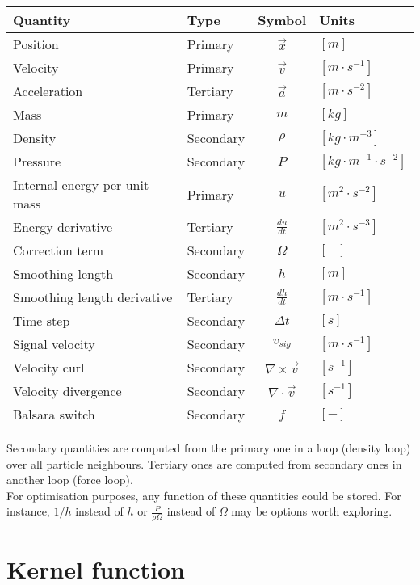 \documentclass[a4paper,10pt]{report}
\begin{document}
\begin{table}[h]
\centering
\begin{tabular}{|l|l|c|l|}
 \hline
 \textbf{Quantity} & \textbf{Type} & \textbf{Symbol} & \textbf{Units} \\
 \hline \hline
 Position & Primary & $\vec{x}$ & $[m]$ \\
 Velocity & Primary &$\vec{v}$ & $[m\cdot s^{-1}]$ \\
 Acceleration & Tertiary &$\vec{a}$ & $[m\cdot s^{-2}]$ \\
 Mass & Primary &$m$ & $[kg]$ \\
 Density & Secondary & $\rho$ & $[kg\cdot m^{-3}]$ \\
 Pressure & Secondary & $P$ & $[kg \cdot m^{-1}\cdot s^{-2}]$ \\
 Internal energy per unit mass & Primary & $u$ & $[m^2 \cdot s^{-2}]$ \\ 
 Energy derivative & Tertiary & $\frac{du}{dt}$ & $[ m^2 \cdot s^{-3}]$ \\
 Correction term & Secondary & $\Omega$ & $[-]$ \\
 Smoothing length & Secondary &$h$ & $[m]$ \\
 Smoothing length derivative & Tertiary &$\frac{dh}{dt}$ & $[m\cdot s^{-1}]$ \\
 Time step & Secondary & $\Delta t$ & $[s]$ \\
 Signal velocity & Secondary & $v_{sig}$& $[m\cdot s^{-1}]$ \\
\hline
 Velocity curl & Secondary & $\nabla\times \vec{v}$ & $[s^{-1}]$ \\
 Velocity divergence & Secondary & $\nabla\cdot \vec{v}$ & $[s^{-1}]$ \\
 Balsara switch & Secondary & $f$ & $[-]$ \\
\hline
\end{tabular} 
\end{table}

Secondary quantities are computed from the primary one in a loop (density loop) over all particle neighbours. Tertiary
ones are computed from secondary ones in another loop (force loop). \\

For optimisation purposes, any function of these quantities could be stored. For instance, $1/h$ instead of $h$ or
$\frac{P}{\rho\Omega}$ instead of $\Omega$ may be options worth exploring. \\

\section{Kernel function}
\end{document}
